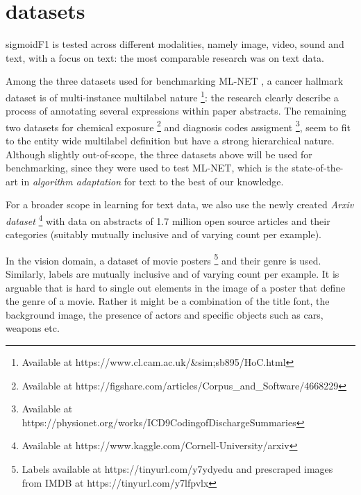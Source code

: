 \documentclass[sigconf,natbib,screen=true,review=true,anonymous]{acmart}
\newcommand\doubt[1]{\textcolor{orange}{DOUBT : #1}}
\begin{document}
\section{datasets}
\label{sec:org14ef215}

sigmoidF1 is tested across different modalities, namely image, video, sound and text, with a focus on text: the most comparable research was on text data.



Among the three datasets used for benchmarking ML-NET \cite{multitaskLabel}, a cancer hallmark dataset is of multi-instance multilabel nature \cite{cancerHallmarks} \footnote{Available at https://www.cl.cam.ac.uk/&sim;sb895/HoC.html}: the research clearly describe a process of annotating several expressions within paper abstracts. The remaining two datasets for chemical exposure \cite{chemExposure} \footnote{Available at https://figshare.com/articles/Corpus_and_Software/4668229} and diagnosis codes assigment \cite{diagnosisCode} \footnote{Available at https://physionet.org/works/ICD9CodingofDischargeSummaries}, seem to fit to the entity wide multilabel definition but have a strong hierarchical nature. Although slightly out-of-scope, the three datasets above will be used for benchmarking, since they were used to test ML-NET, which is the state-of-the-art in \emph{algorithm adaptation} for text to the best of our knowledge.

For a broader scope in learning for text data, we also use the newly created \emph{Arxiv dataset} \footnote{Available at https://www.kaggle.com/Cornell-University/arxiv} with data on abstracts of 1.7 million open source articles and their categories (suitably mutually inclusive and of varying count per example).

In the vision domain, a dataset of movie posters \footnote{Labels available at https://tinyurl.com/y7ydyedu and prescraped images from IMDB at https://tinyurl.com/y7lfpvlx} and their genre is used. Similarly, labels are mutually inclusive and of varying count per example. It is arguable that is hard to single out elements in the image of a poster that define the genre of a movie. Rather it might be a combination of the title font, the background image, the presence of actors and specific objects such as cars, weapons etc. 
\end{document}
